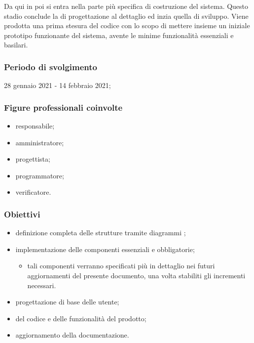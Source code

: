 Da qui in poi si entra nella parte più specifica di costruzione del sistema. Questo stadio conclude la  di progettazione al dettaglio ed inzia quella di sviluppo. Viene prodotta una prima stesura del codice con lo scopo di mettere insieme un iniziale prototipo funzionante del sistema, avente le minime funzionalità essenziali e basilari. 
        
        \subsubsection{Periodo di svolgimento}
        28 gennaio 2021 - 14 febbraio 2021;
        
        \subsubsection{Figure professionali coinvolte}
            \begin{itemize}
                \item responsabile;
                \item amministratore;
                \item progettista;
                \item programmatore;
                \item verificatore.
            \end{itemize}

        \subsubsection{Obiettivi}    
        \begin{itemize}
            \item definizione completa delle strutture tramite diagrammi ;
            \item implementazione delle componenti essenziali e obbligatorie;
            \begin{itemize}
                \item tali componenti verranno specificati più in dettaglio nei futuri aggiornamenti del presente documento, una volta stabiliti gli incrementi necessari.
            \end{itemize}
            \item progettazione di base delle  utente;
            \item {} del codice e delle funzionalità del prodotto;
            \item aggiornamento della documentazione.
        \end{itemize}